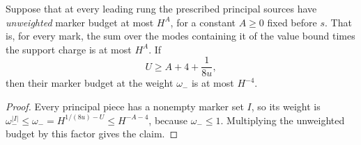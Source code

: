 \begin{lemma}
\label{lem:allarity-leading-budget}
Suppose that at every leading rung the prescribed principal sources have
\emph{unweighted} marker budget at most $H^{A}$, for a constant $A\ge0$
fixed before $s$. That is, for every mark, the sum over the modes
containing it of the value bound times the support charge is at most
$H^{A}$. If
\[
 U\ge A+4+\frac1{8u},
\]
then their marker budget at the weight $\omega_-$ is at most $H^{-4}$.
\end{lemma}
\begin{proof}
Every principal piece has a nonempty marker set $I$, so its weight is
$\omega_-^{|I|}\le\omega_-=H^{1/(8u)-U}\le H^{-A-4}$, because
$\omega_-\le1$. Multiplying the unweighted budget by this factor gives
the claim.
\end{proof}

